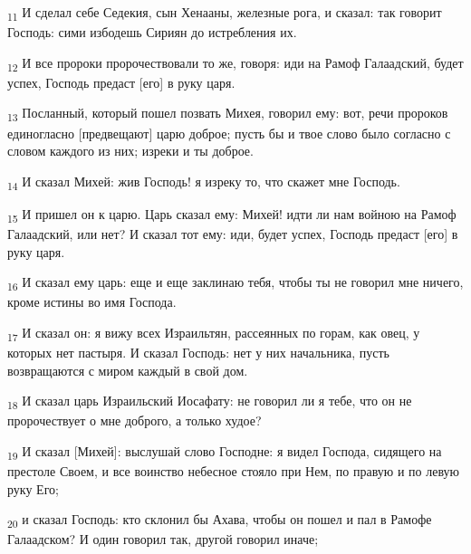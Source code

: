 \begin{tcolorbox}
\textsubscript{11} И сделал себе Седекия, сын Хенааны, железные рога, и сказал: так говорит Господь: сими избодешь Сириян до истребления их.
\end{tcolorbox}
\begin{tcolorbox}
\textsubscript{12} И все пророки пророчествовали то же, говоря: иди на Рамоф Галаадский, будет успех, Господь предаст [его] в руку царя.
\end{tcolorbox}
\begin{tcolorbox}
\textsubscript{13} Посланный, который пошел позвать Михея, говорил ему: вот, речи пророков единогласно [предвещают] царю доброе; пусть бы и твое слово было согласно с словом каждого из них; изреки и ты доброе.
\end{tcolorbox}
\begin{tcolorbox}
\textsubscript{14} И сказал Михей: жив Господь! я изреку то, что скажет мне Господь.
\end{tcolorbox}
\begin{tcolorbox}
\textsubscript{15} И пришел он к царю. Царь сказал ему: Михей! идти ли нам войною на Рамоф Галаадский, или нет? И сказал тот ему: иди, будет успех, Господь предаст [его] в руку царя.
\end{tcolorbox}
\begin{tcolorbox}
\textsubscript{16} И сказал ему царь: еще и еще заклинаю тебя, чтобы ты не говорил мне ничего, кроме истины во имя Господа.
\end{tcolorbox}
\begin{tcolorbox}
\textsubscript{17} И сказал он: я вижу всех Израильтян, рассеянных по горам, как овец, у которых нет пастыря. И сказал Господь: нет у них начальника, пусть возвращаются с миром каждый в свой дом.
\end{tcolorbox}
\begin{tcolorbox}
\textsubscript{18} И сказал царь Израильский Иосафату: не говорил ли я тебе, что он не пророчествует о мне доброго, а только худое?
\end{tcolorbox}
\begin{tcolorbox}
\textsubscript{19} И сказал [Михей]: выслушай слово Господне: я видел Господа, сидящего на престоле Своем, и все воинство небесное стояло при Нем, по правую и по левую руку Его;
\end{tcolorbox}
\begin{tcolorbox}
\textsubscript{20} и сказал Господь: кто склонил бы Ахава, чтобы он пошел и пал в Рамофе Галаадском? И один говорил так, другой говорил иначе;
\end{tcolorbox}
